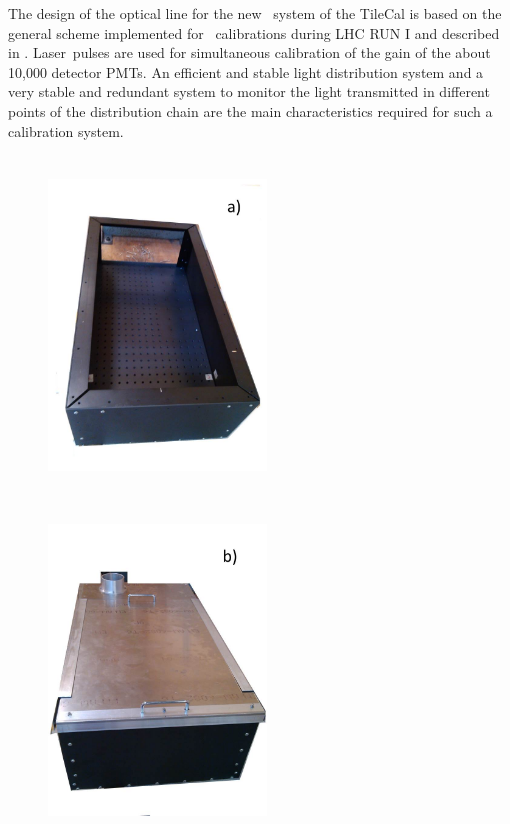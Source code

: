 The design of the optical line for the new \lasii~system of the TileCal is based on the general scheme implemented for \laser~calibrations
during LHC RUN I and described in \cite{ref:lasercalvet}. Laser~pulses are used for
simultaneous calibration of the gain of the about 10,000 detector PMTs.
An efficient and stable light distribution system and a very stable and redundant
system to monitor the light transmitted in different points of the distribution
chain are the main characteristics required for such a calibration system.

% 
\begin{figure}[htbp]
\begin{center} 
\includegraphics[width=5.8cm, height=9cm]{figures/Optics_box_1}
\includegraphics[width=5.8cm, height=9cm]{figures/Optics_box_2}

\end{center}
\end{figure}
